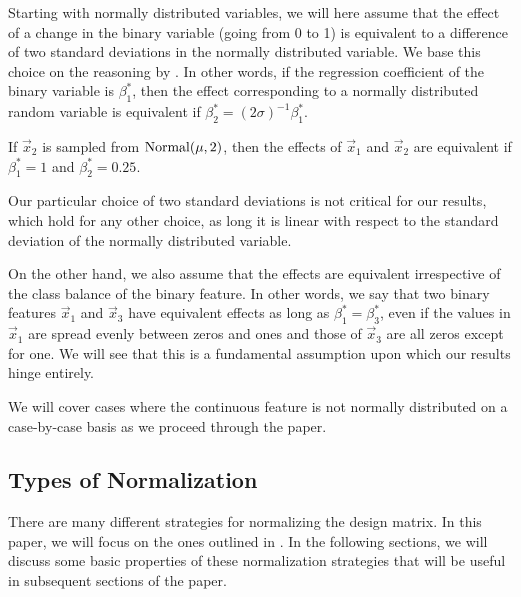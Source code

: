 Starting with normally distributed variables, we will here assume that the effect of a change in the binary variable (going from 0 to 1) is equivalent to a difference of two standard deviations in the normally distributed variable. We base this choice on the reasoning by \textcite{gelman2008}. In other words, if the regression coefficient of the binary variable is \(\beta^*_1\), then the effect corresponding to a normally distributed random variable is equivalent if \(\beta^*_2 = (2\sigma)^{-1} \beta_1^*\).

\begin{example}
  If \(\vec{x}_2\) is sampled from \(\operatorname{Normal}(\mu, 2)\), then the effects of \(\vec{x}_1\) and \(\vec{x}_2\) are equivalent if \(\beta_1^* = 1\) and \(\beta_2^* = 0.25\).
\end{example}

Our particular choice of two standard deviations is not critical for our results, which hold for any other choice, as long it is linear with respect to the standard deviation of the normally distributed variable.

On the other hand, we also assume that the effects are equivalent irrespective of the class balance of the binary feature. In other words, we say that two binary features \(\vec{x}_1\) and \(\vec{x}_3\) have equivalent effects as long as \(\beta_1^* = \beta_3^*\), even if the values in \(\vec{x}_1\) are spread evenly between zeros and ones and those of \(\vec{x}_3\) are all zeros except for one. We will see that this is a fundamental assumption upon which our results hinge entirely.

We will cover cases where the continuous feature is not normally distributed on a case-by-case basis as we proceed through the paper.

\subsection{Types of Normalization}

There are many different strategies for normalizing the design matrix. In this paper, we will focus on the ones outlined in .
In the following sections, we will discuss some basic properties of these normalization strategies that will be useful in subsequent sections of the paper.

